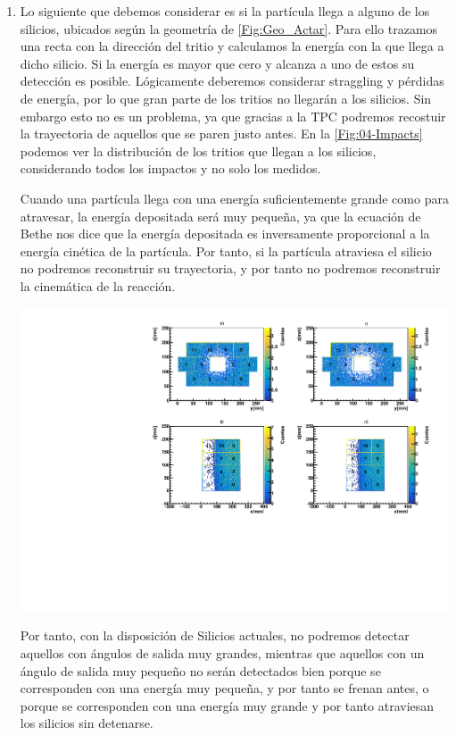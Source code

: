 \begin{enumerate}
    
    \item Lo siguiente que debemos considerar es si la partícula llega a alguno de los silicios, ubicados según la geometría de \cref{Fig:Geo_Actar}. Para ello trazamos una recta con la dirección del tritio y calculamos la energía con la que llega a dicho silicio. Si la energía es mayor que cero y alcanza a uno de estos su detección es posible. Lógicamente deberemos considerar straggling y pérdidas de energía, por lo que gran parte de los tritios no llegarán a los silicios. Sin embargo esto no es un problema, ya que gracias a la TPC podremos recostuir la trayectoria de aquellos que se paren justo antes. En la \cref{Fig:04-Impacts} podemos ver la distribución de los tritios que llegan a los silicios, considerando todos los impactos y no solo los medidos. 
    
    Cuando una partícula llega con una energía suficientemente grande como para atravesar, la energía depositada será muy pequeña, ya que la ecuación de Bethe nos dice que la energía depositada es inversamente proporcional a la energía cinética de la partícula. Por tanto, si la partícula atraviesa el silicio no podremos reconstruir su trayectoria, y por tanto no podremos reconstruir la cinemática de la reacción. 

    \begin{center}
        \includegraphics[width=0.95\linewidth]{Imagenes/Impacts/Impacts_Ex0.00_incIdx0.pdf}

        \label{Fig:04-Impacts}
    \end{center}
    

    Por tanto, con la disposición de Silicios actuales, no podremos detectar aquellos con ángulos de salida muy grandes, mientras que aquellos con un ángulo de salida muy pequeño no serán detectados bien porque se corresponden con una energía muy pequeña, y por tanto se frenan antes, o porque se corresponden con una energía muy grande y por tanto atraviesan los silicios sin detenarse. 


\end{enumerate}
